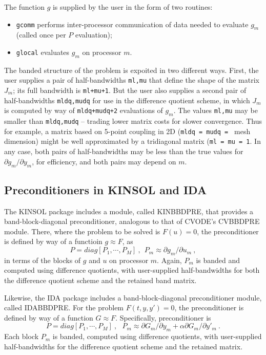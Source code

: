 The function $g$ is supplied by the user in the form of two routines:
\vspace*{-.19in}
\begin{itemize}
\item {\tt gcomm} performs inter-processor communication of data needed to
evaluate $g_m$ (called once per $P$ evaluation);
\item {\tt glocal} evaluates $g_m$ on processor $m$.
\end{itemize}
The banded structure of the problem is expoited in two different ways.
First, the user supplies a pair of half-bandwidths {\tt ml,mu} that
define the shape of the matrix $J_m$; its full bandwidth is
{\tt ml+mu+1}.  But the user also supplies a second pair of
half-bandwidths {\tt mldq,mudq} for use in the difference quotient
scheme, in which $J_m$ is computed by way of {\tt mldq+mudq+2}
evaluations of $g_m$.  The values {\tt ml,mu} may be smaller than
{\tt mldq,mudq} -- trading lower matrix costs for slower convergence.
Thus for example, a matrix based on 5-point coupling in 2D
({\tt mldq = mudq = } mesh dimension) might be well approximated by a
tridiagonal matrix ({\tt ml = mu = 1}.  In any case, both pairs of
half-bandwidths may be less than the true values for
$\partial g_m / \partial y_m$, for efficiency, and both pairs may
depend on $m$.

\subsection{Preconditioners in KINSOL and IDA}

The KINSOL package includes a module, called KINBBDPRE, that provides
a band-block-diagonal preconditioner, analogous to that of CVODE's
CVBBDPRE module.  There, where the problem to be solved is $F(u) = 0$,
the preconditioner is defined by way of a functioin $g \approx F$, as
\[ P = diag[P_1,\cdots,P_M] ~,~~
P_m \approx \partial g_m / \partial u_m ~, \]
in terms of the blocks of $g$ and $u$ on processor $m$.  Again, $P_m$
is banded and computed using difference quotients, with user-supplied
half-bandwidths for both the difference quotient scheme and the
retained band matrix.

Likewise, the IDA package includes a band-block-diagonal
preconditioner module, called IDABBDPRE.  For the problem
$F(t,y,y') = 0$, the preconditioner is defined by way of a function $G
\approx F$.  Specifically, preconditioner is
\[ P = diag[P_1,\cdots,P_M] ~,~~~
   P_m \approx \partial G_m / \partial y_m
        + \alpha \partial G_m / \partial y'_m ~. \]
Each block $P_m$ is banded, computed using difference quotients, with
user-supplied half-bandwidths for the difference quotient scheme and
the retained matrix.


